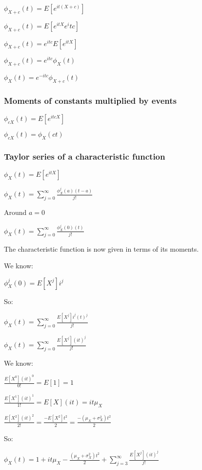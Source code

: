 $\phi_{X+c}(t)=E[e^{it(X+c)}]$

$\phi_{X+c}(t)=E[e^{itX}e^itc]$

$\phi_{X+c}(t)=e^{itc}E[e^{itX}]$

$\phi_{X+c}(t)=e^{itc}\phi_X(t)$

$\phi_{X}(t)=e^{-itc}\phi_{X+c}(t)$

\subsubsection{Moments of constants multiplied by events}

$\phi_{cX}(t)=E[e^{itcX}]$

$\phi_{cX}(t) = \phi_{X}(ct)$

\subsubsection{Taylor series of a characteristic function}

$\phi_X(t)=E[e^{itX}]$

$\phi_X(t)=\sum_{j=0}^{\infty }\frac{\phi_X^j(a)(t-a)}{j!}$

Around \(a=0\)

$\phi_X(t)=\sum_{j=0}^{\infty }\frac{\phi_X^j(0)(t)}{j!}$

The characteristic function is now given in terms of its moments.

We know:

$\phi_X^j(0)=E[X^j]i^j$

So:

$\phi_X(t)=\sum_{j=0}^{\infty }\frac{E[X^j]i^j(t)^j}{j!}$

$\phi_X(t)=\sum_{j=0}^{\infty }\frac{E[X^j](it)^j}{j!}$

We know:

$\frac{E[X^0](it)^0}{0!}=E[1]=1$

$\frac{E[X^1](it)^1}{1!}=E[X](it)=it\mu_X $

$\frac{E[X^2](it)^2}{2!}=\frac{-E[X^2]t^2}{2}=\frac{-(\mu_X +\sigma_X^2 )t^2}{2}$

So:

$\phi_X(t)=1+it\mu_X -\frac{(\mu_X +\sigma_X^2 )t^2}{2} +\sum_{j=3}^{\infty }\frac{E[X^j](it)^j}{j!}$
